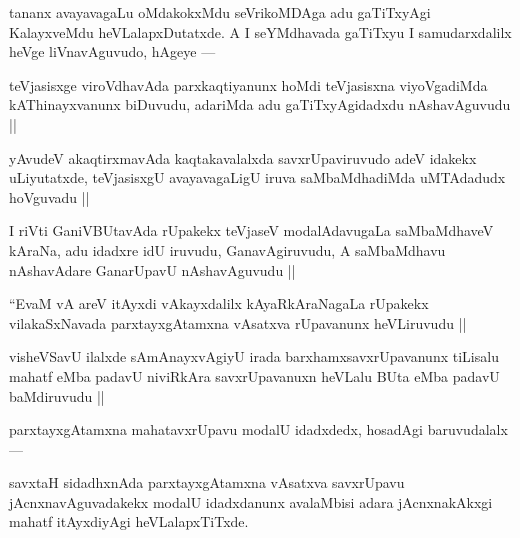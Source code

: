 \begin{artha}
tananx avayavagaLu oMdakokxMdu seVrikoMDAga adu gaTiTxyAgi KalayxveMdu heVLalapxDutatxde. A I seYMdhavada gaTiTxyu I samudarxdalilx heVge liVnavAguvudo, hAgeye ---
\end{artha}

\begin{artha}
teVjasisxge viroVdhavAda parxkaqtiyanunx hoMdi teVjasisxna viyoVgadiMda kAThinayxvanunx biDuvudu, adariMda adu gaTiTxyAgidadxdu nAshavAguvudu ||
\end{artha}

\begin{artha}
yAvudeV akaqtirxmavAda kaqtakavalalxda savxrUpaviruvudo adeV idakekx uLiyutatxde, teVjasisxgU avayavagaLigU iruva saMbaMdhadiMda uMTAdadudx hoVguvadu ||
\end{artha}

\begin{artha}
I riVti GaniVBUtavAda rUpakekx teVjaseV modalAdavugaLa saMbaMdhaveV kAraNa, adu idadxre idU iruvudu, GanavAgiruvudu, A saMbaMdhavu nAshavAdare GanarUpavU nAshavAguvudu ||
\end{artha}


\begin{artha}
``EvaM vA areV itAyxdi vAkayxdalilx kAyaRkAraNagaLa rUpakekx vilakaSxNavada parxtayxgAtamxna vAsatxva rUpavanunx heVLiruvudu ||
\end{artha}


\begin{artha}
visheVSavU ilalxde sAmAnayxvAgiyU irada barxhamxsavxrUpavanunx tiLisalu mahatf eMba padavU niviRkAra savxrUpavanuxn heVLalu BUta eMba padavU baMdiruvudu ||
\end{artha}

\begin{artha}
parxtayxgAtamxna mahatavxrUpavu modalU idadxdedx, hosadAgi baruvudalalx ---
\end{artha}

\begin{artha}
savxtaH sidadhxnAda parxtayxgAtamxna vAsatxva savxrUpavu jAcnxnavAguvadakekx modalU idadxdanunx avalaMbisi adara jAcnxnakAkxgi mahatf itAyxdiyAgi heVLalapxTiTxde. 
\end{artha}


